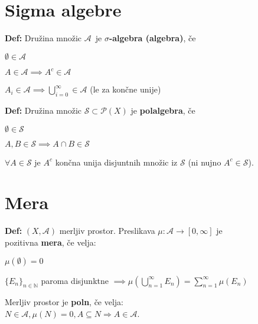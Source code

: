 \documentclass[a4paper,oneside,10pt]{article}
\title{\Title}
\author{\Author}
\date{\today}
\theoremstyle{definition}
\newcommand{\N}{\ensuremath{\mathbb{N}}}
\newenvironment{itemize*}{\vspace{-10pt}\begin{itemize}\setlength{\itemsep}{0pt}\setlength{\parskip}{2pt}}{\end{itemize}}
\newcommand{\A}{\ensuremath{\mathcal{A}}}
\renewcommand{\S}{\ensuremath{\mathcal{S}}}
\renewcommand{\P}{\ensuremath{\mathcal{P}}}
\begin{document}
\vspace{-2ex}
\section*{Sigma algebre}
\vspace{-2ex}
\begin{minipage}{0.49\textwidth}
  \textbf{Def:} Družina množic \A~je \textbf{$\sigma$-algebra (algebra)}, če
  \begin{itemize*}
    \item $\emptyset \in \A$
    \item $A \in \A \implies A^c \in \A$
    \item $A_i \in \A \implies \bigcup_{i=0}^\infty \in \A$ (le za končne unije)
  \end{itemize*}
\end{minipage}
\begin{minipage}{0.49\textwidth}
  \textbf{Def:} Družina množic $\S \subset \P(X)$ je \textbf{polalgebra}, če
  \begin{itemize*}
    \item $\emptyset \in \S$
    \item $A, B \in \S \implies A \cap B \in \S$
    \item $\forall A \in \S$ je $A^c$ končna unija disjuntnih množic iz $\S$ (ni nujno $A^c \in \S$).
  \end{itemize*}
\end{minipage}

\vspace{-4ex}
\section*{Mera}
\begin{minipage}{0.6\textwidth}
  \textbf{Def:} $(X, \A)$ merljiv prostor. Preslikava $\mu \colon \A \to [0, \infty]$
  je \\pozitivna \textbf{mera}, če velja:
  \begin{itemize*}
    \item $\mu(\emptyset) = 0$
    \item $\{E_n\}_{n \in \N}$ paroma disjunktne
      $\implies \mu(\bigcup_{n = 1}^\infty E_n) = \sum_{n = 1}^\infty \mu(E_n)$
  \end{itemize*}
\end{minipage}
\begin{minipage}{0.39\textwidth}
  Merljiv prostor je \textbf{poln}, če velja:\\$N \in \A, \mu(N) = 0, A
  \subseteq N \Rightarrow A \in \A$.
\end{minipage}
\end{document}
